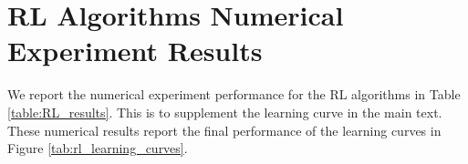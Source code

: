 \section{RL Algorithms Numerical Experiment Results}

We report the numerical experiment performance for the RL algorithms in Table \ref{table:RL_results}. This is to supplement the learning curve in the main text. These numerical results report the final performance of the learning curves in Figure \ref{tab:rl_learning_curves}.


